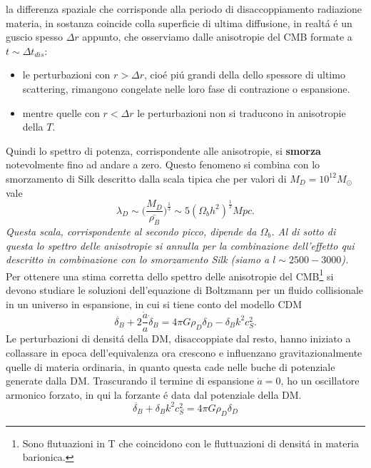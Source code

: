 \documentclass[12pt, a4paper]{article}
\begin{document}
la differenza spaziale che corrisponde alla periodo di disaccoppiamento radiazione materia, in sostanza coincide colla superficie di ultima diffusione, in realt\'{a} \'{e} un guscio spesso $\Delta r$ appunto, che osserviamo dalle anisotropie del CMB formate a $t\sim \Delta t_{dis}$:
\begin{itemize}
\item le perturbazioni con $r>\Delta r$, cio\'{e} pi\'{u} grandi della dello spessore di ultimo scattering, rimangono congelate nelle loro fase di contrazione o espansione.
\item mentre quelle con $r<\Delta r$ le perturbazioni non si traducono in anisotropie della $T$.
\end{itemize}
Quindi lo spettro di potenza, corrispondente alle anisotropie, si \textbf{smorza} notevolmente fino ad andare a zero. Questo fenomeno si combina con lo smorzamento di Silk descritto dalla scala tipica che per valori di $M_D=10^{12} M_\odot$ vale
\begin{equation}
\lambda_D\sim \biggl( \frac{M_D}{\bar{\rho_B}}\biggr)^{\frac{1}{3}} \sim 5 (\Omega_b h^2)^{\frac{1}{2}} Mpc.
\end{equation}
\textit{Questa scala, corrispondente al secondo picco, dipende da $\Omega_b$. Al di sotto di questa lo spettro delle anisotropie si annulla per la combinazione dell'effetto qui descritto in combinazione con lo smorzamento Silk (siamo a $l\sim 2500-3000$).}\\
Per ottenere una stima corretta dello spettro delle anisotropie del CMB\footnote{Sono flutuazioni in T che coincidono con le fluttuazioni di densit\'{a} in materia barionica.} si devono studiare le soluzioni dell'equazione di Boltzmann per un fluido collisionale in un universo in espansione, in cui si tiene conto del modello CDM
\begin{equation}
\ddot{\delta_B}+2 \frac{\dot{a}}{a}\dot{\delta}_B  =4 \pi G \rho_D \delta_D-\delta_B k^2 c_S^2.
\end{equation}
Le perturbazioni di densit\'{a} della DM, disaccoppiate dal resto,  hanno iniziato a collassare in epoca dell'equivalenza ora crescono e influenzano gravitazionalmente quelle di materia ordinaria, in quanto questa cade nelle buche di potenziale generate dalla DM. Trascurando il termine di espansione $\dot{a}=0$, ho un oscillatore armonico forzato, in qui la forzante \'{e} data dal potenziale della DM. 
\begin{equation}
\ddot{\delta_B}+ \delta_B k^2 c_S^2=4 \pi G \rho_D \delta_D
\end{equation}
\end{document}
